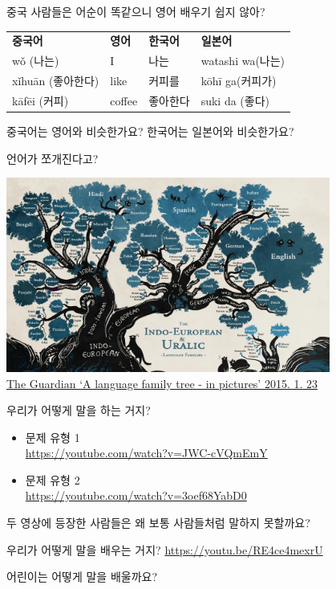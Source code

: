 \documentclass[11pt, aspectratio=169]{beamer}
\begin{document}
\begin{frame}[t]{}
  \begin{block}{중국 사람들은 어순이 똑같으니 영어 배우기 쉽지 않아?}
    \begin{tabular}{llll}
      \textbf{중국어} & \textbf{영어} & \textbf{한국어} & \textbf{일본어} \\
      wǒ (나는) & I & 나는 & watashi wa(나는) \\
      xǐhuān (좋아한다) & like & 커피를 & kōhī ga(커피가) \\
      kāfēi (커피) & coffee & 좋아한다 & suki da (좋다) \\
    \end{tabular}
  \end{block}
  중국어는 영어와 비슷한가요? 한국어는 일본어와 비슷한가요?
\end{frame}

\begin{frame}[t]{}
  \begin{block}{언어가 쪼개진다고?}
    \begin{center}
      \includegraphics[width=0.8\textwidth]{img/fe0733eb-8981-441d-9323-a9c635347ab8-2060x1236.jpg}\\
      \href{https://www.theguardian.com/education/gallery/2015/jan/23/a-language-family-tree-in-pictures}{The Guardian ‘A language family tree - in pictures’ 2015. 1. 23}
    \end{center}
  \end{block}
\end{frame}

\begin{frame}[t]{}
  \begin{block}{우리가 어떻게 말을 하는 거지?}
    \begin{itemize}
      \item 문제 유형 1 \\ \href{https://youtube.com/watch?v=JWC-cVQmEmY}{https://youtube.com/watch?v=JWC-cVQmEmY}
      \item 문제 유형 2 \\ \href{https://youtube.com/watch?v=3oef68YabD0}{https://youtube.com/watch?v=3oef68YabD0}
    \end{itemize}
  \end{block}
  두 영상에 등장한 사람들은 왜 보통 사람들처럼 말하지 못할까요?
  \vfill
  \begin{block}{우리가 어떻게 말을 배우는 거지?}
    \href{https://youtu.be/RE4ce4mexrU}{https://youtu.be/RE4ce4mexrU}
  \end{block}
  어린이는 어떻게 말을 배울까요?
\end{frame}
\end{document}
